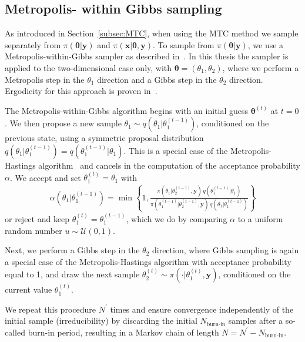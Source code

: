 \subsection{Metropolis- within Gibbs sampling}
As introduced in Section~\ref{subsec:MTC}, when using the MTC method we sample separately from $\pi(\bm{\theta} |  \bm{y})$ and $\pi(\bm{x} |  \bm{\theta}, \bm{y})$. To sample from $\pi(\bm{\theta} |  \bm{y})$, we use a Metropolis-within-Gibbs sampler as described in~\cite{fox2016fast}.
In this thesis the sampler is applied to the two-dimensional case only, with $\bm{\theta} = (\theta_1, \theta_2)$, where we perform a Metropolis step in the $\theta_1$ direction and a Gibbs step in the $\theta_2$ direction.
Ergodicity for this approach is proven in~\cite{roberts2006harris}.

The Metropolis-within-Gibbs algorithm begins with an initial guess $\bm{\theta}^{(t)}$ at $t=0$. We then propose a new sample $\theta_1 \sim q(\theta_1 |  \theta_1^{(t-1)})$, conditioned on the previous state, using a symmetric proposal distribution $q(\theta_1 |  \theta_1^{(t-1)}) = q(\theta_1^{(t-1)} |  \theta_1)$.
This is a special case of the Metropolis-Hastings algorithm~\cite{roberts2006harris} and cancels in the computation of the acceptance probability $\alpha$. 
We accept and set $\theta_1^{(t)} = \theta_1$ with
\begin{align}
	\alpha(\theta_1 |  \theta_1^{(t-1)}) = \min \left\{ 1, \frac{\pi(\theta_1 |  \theta_2^{(t-1)}, \bm{y}) \, q(\theta_1^{(t-1)} |  \theta_1)}{\pi(\theta_1^{(t-1)} |  \theta_2^{(t-1)}, \bm{y}) \, q(\theta_1 |  \theta_1^{(t-1)})} \right\}
\end{align}
or reject and keep $\theta_1^{(t)} = \theta_1^{(t-1)}$, which we do by comparing $\alpha$ to a uniform random number $u \sim \mathcal{U}(0,1)$. 

Next, we perform a Gibbs step in the $\theta_2$ direction, where Gibbs sampling is again a special case of the Metropolis-Hastings algorithm with acceptance probability equal to 1, and draw the next sample $\theta_2^{(t)} \sim \pi(\cdot |  \theta_1^{(t)}, \bm{y})$, conditioned on the current value $\theta_1^{(t)}$. 

We repeat this procedure $N^{\prime}$ times and ensure convergence independently of the initial sample (irreducibility) by discarding the initial $N_{\text{burn-in}}$ samples after a so-called burn-in period, resulting in a Markov chain of length $N = N^{\prime} - N_{\text{burn-in}}$.

